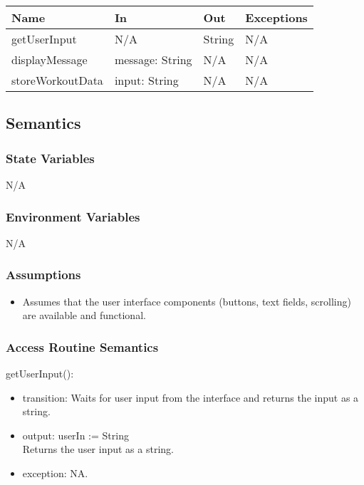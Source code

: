 \documentclass[12pt, titlepage]{article}
\begin{document}
\begin{center}
\begin{tabular}{l l l l}
\hline
\textbf{Name} & \textbf{In} & \textbf{Out} & \textbf{Exceptions} \\
\hline
getUserInput & N/A & String & N/A \\
displayMessage & message: String & N/A & N/A \\
storeWorkoutData & input: String & N/A & N/A \\

\hline
\end{tabular}
\end{center}

\subsection{Semantics}

\subsubsection{State Variables}
N/A

\subsubsection{Environment Variables}
N/A

\subsubsection{Assumptions}
\begin{itemize}
\item Assumes that the user interface components (buttons, text fields, scrolling) are available and functional.
\end{itemize}


\subsubsection{Access Routine Semantics}

\noindent getUserInput():
\begin{itemize}
\item transition: Waits for user input from the interface and returns the input as a string.
\item output: userIn := String \\
Returns the user input as a string.
\item exception: NA.
\end{itemize}
\end{document}
